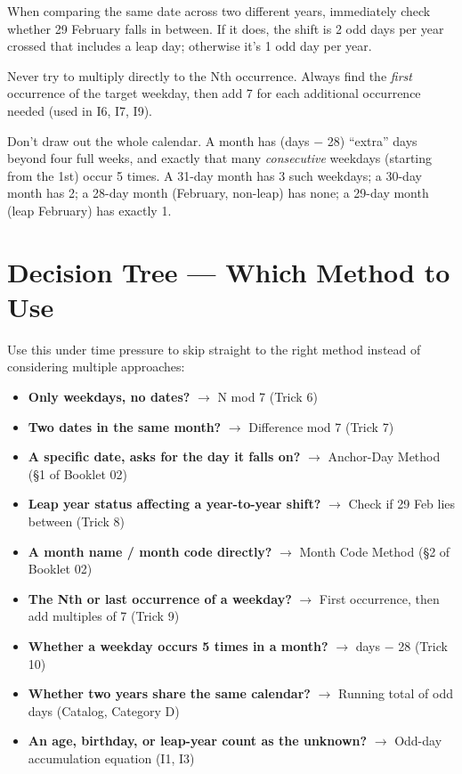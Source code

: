 \documentclass[11pt]{article}
\begin{document}
\begin{tipbox}
When comparing the same date across two different years, immediately check whether 29 February falls
in between. If it does, the shift is 2 odd days per year crossed that includes a leap day; otherwise
it's 1 odd day per year.
\end{tipbox}

\begin{tipbox}
Never try to multiply directly to the Nth occurrence. Always find the \emph{first} occurrence of the
target weekday, then add 7 for each additional occurrence needed (used in I6, I7, I9).
\end{tipbox}

\begin{tipbox}
Don't draw out the whole calendar. A month has (days $-$ 28) ``extra'' days beyond four full weeks,
and exactly that many \emph{consecutive} weekdays (starting from the 1st) occur 5 times. A 31-day
month has 3 such weekdays; a 30-day month has 2; a 28-day month (February, non-leap) has none; a
29-day month (leap February) has exactly 1.
\end{tipbox}

\section*{Decision Tree --- Which Method to Use}

\noindent Use this under time pressure to skip straight to the right method instead of considering
multiple approaches:

\begin{formulabox}
\begin{itemize}[leftmargin=1.4em]
  \item \textbf{Only weekdays, no dates?} $\to$ N mod 7 (Trick 6)
  \item \textbf{Two dates in the same month?} $\to$ Difference mod 7 (Trick 7)
  \item \textbf{A specific date, asks for the day it falls on?} $\to$ Anchor-Day Method (\S1 of
  Booklet 02)
  \item \textbf{Leap year status affecting a year-to-year shift?} $\to$ Check if 29 Feb lies
  between (Trick 8)
  \item \textbf{A month name / month code directly?} $\to$ Month Code Method (\S2 of Booklet 02)
  \item \textbf{The Nth or last occurrence of a weekday?} $\to$ First occurrence, then add
  multiples of 7 (Trick 9)
  \item \textbf{Whether a weekday occurs 5 times in a month?} $\to$ days $-$ 28 (Trick 10)
  \item \textbf{Whether two years share the same calendar?} $\to$ Running total of odd days
  (Catalog, Category D)
  \item \textbf{An age, birthday, or leap-year count as the unknown?} $\to$ Odd-day accumulation
  equation (I1, I3)
\end{itemize}
\end{formulabox}
\end{document}

